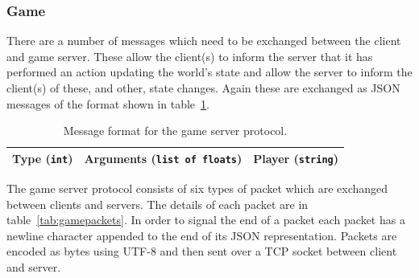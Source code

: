\documentclass[12pt,notitlepage,a4paper]{report}
\begin{document}
	\subsubsection{Game}
	There are a number of messages which need to be exchanged between the client and game server. These allow the client(s) to inform the server that it has performed an action updating the world's state and allow the server to inform the client(s) of these, and other, state changes. Again these are exchanged as JSON messages of the format shown in table~\ref{tab:gameprotocol}.
	\begin{table}[!ht]
		\centering
		\begin{tabularx}{0.85\textwidth}{| l | l | X |}
			\hline
			Type (\texttt{int}) & Arguments (\texttt{list of floats}) & Player (\texttt{string})\\
			\hline
		\end{tabularx}
		\caption{Message format for the game server protocol.}
		\label{tab:gameprotocol}
	\end{table}

	The game server protocol consists of six types of packet which are exchanged between clients and servers. The details of each packet are in table~\ref{tab:gamepackets}. In order to signal the end of a packet each packet has a newline character appended to the end of its JSON representation. Packets are encoded as bytes using UTF-8 and then sent over a TCP socket between client and server.
\end{document}
